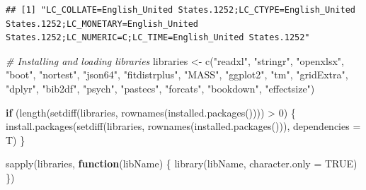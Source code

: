 \documentclass[
]{article}
\newenvironment{Shaded}{\begin{snugshade}}{\end{snugshade}}
\newcommand{\AttributeTok}[1]{\textcolor[rgb]{0.77,0.63,0.00}{#1}}
\newcommand{\CommentTok}[1]{\textcolor[rgb]{0.56,0.35,0.01}{\textit{#1}}}
\newcommand{\ConstantTok}[1]{\textcolor[rgb]{0.00,0.00,0.00}{#1}}
\newcommand{\ControlFlowTok}[1]{\textcolor[rgb]{0.13,0.29,0.53}{\textbf{#1}}}
\newcommand{\DecValTok}[1]{\textcolor[rgb]{0.00,0.00,0.81}{#1}}
\newcommand{\FunctionTok}[1]{\textcolor[rgb]{0.00,0.00,0.00}{#1}}
\newcommand{\NormalTok}[1]{#1}
\newcommand{\OtherTok}[1]{\textcolor[rgb]{0.56,0.35,0.01}{#1}}
\newcommand{\SpecialCharTok}[1]{\textcolor[rgb]{0.00,0.00,0.00}{#1}}
\newcommand{\StringTok}[1]{\textcolor[rgb]{0.31,0.60,0.02}{#1}}
\begin{document}
\begin{verbatim}
## [1] "LC_COLLATE=English_United States.1252;LC_CTYPE=English_United States.1252;LC_MONETARY=English_United States.1252;LC_NUMERIC=C;LC_TIME=English_United States.1252"
\end{verbatim}

\begin{Shaded}
\begin{Highlighting}[]
\CommentTok{\# Installing and loading libraries}
\NormalTok{libraries }\OtherTok{\textless{}{-}} \FunctionTok{c}\NormalTok{(}\StringTok{"readxl"}\NormalTok{, }\StringTok{"stringr"}\NormalTok{, }\StringTok{"openxlsx"}\NormalTok{, }\StringTok{"boot"}\NormalTok{, }\StringTok{"nortest"}\NormalTok{, }\StringTok{"json64"}\NormalTok{, }\StringTok{"fitdistrplus"}\NormalTok{, }\StringTok{"MASS"}\NormalTok{, }\StringTok{"ggplot2"}\NormalTok{, }\StringTok{"tm"}\NormalTok{, }\StringTok{"gridExtra"}\NormalTok{, }\StringTok{"dplyr"}\NormalTok{, }\StringTok{"bib2df"}\NormalTok{, }\StringTok{"psych"}\NormalTok{, }\StringTok{"pastecs"}\NormalTok{, }\StringTok{"forcats"}\NormalTok{, }\StringTok{"bookdown"}\NormalTok{, }\StringTok{"effectsize"}\NormalTok{)}

\ControlFlowTok{if}\NormalTok{ (}\FunctionTok{length}\NormalTok{(}\FunctionTok{setdiff}\NormalTok{(libraries, }\FunctionTok{rownames}\NormalTok{(}\FunctionTok{installed.packages}\NormalTok{()))) }\SpecialCharTok{\textgreater{}} \DecValTok{0}\NormalTok{) \{}
  \FunctionTok{install.packages}\NormalTok{(}\FunctionTok{setdiff}\NormalTok{(libraries, }\FunctionTok{rownames}\NormalTok{(}\FunctionTok{installed.packages}\NormalTok{())), }\AttributeTok{dependencies =}\NormalTok{ T)  }
\NormalTok{\}}

\FunctionTok{sapply}\NormalTok{(libraries, }\ControlFlowTok{function}\NormalTok{(libName) \{ }
  \FunctionTok{library}\NormalTok{(libName, }\AttributeTok{character.only =} \ConstantTok{TRUE}\NormalTok{)}
\NormalTok{\})}
\end{Highlighting}
\end{Shaded}
\end{document}

